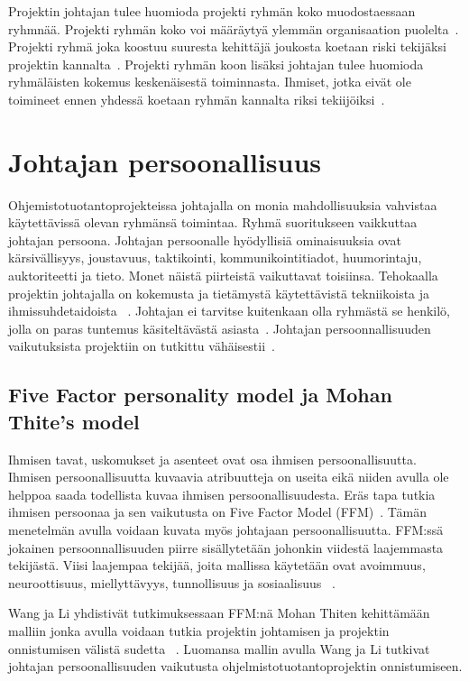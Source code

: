\documentclass[finnish]{tktltiki2}
\theoremstyle{definition}
\theoremstyle{remark}
\begin{document}
Projektin johtajan tulee huomioda projekti ryhmän koko muodostaessaan ryhmnää. Projekti ryhmän koko voi määräytyä ylemmän organisaation puolelta~\cite{McLeod:2011:FAS:1978802.1978803}. Projekti ryhmä joka koostuu suuresta kehittäjä joukosta koetaan riski tekijäksi projektin kannalta~\cite{McLeod:2011:FAS:1978802.1978803}. Projekti ryhmän koon lisäksi johtajan tulee huomioda ryhmäläisten kokemus keskenäisestä toiminnasta. Ihmiset, jotka eivät ole toimineet ennen yhdessä koetaan ryhmän kannalta riksi tekiijöiksi~\cite{McLeod:2011:FAS:1978802.1978803}.

\section{Johtajan persoonallisuus}

Ohjemistotuotantoprojekteissa johtajalla on monia mahdollisuuksia vahvistaa käytettävissä olevan ryhmänsä toimintaa. Ryhmä suoritukseen vaikkuttaa johtajan persoona. Johtajan persoonalle hyödyllisiä ominaisuuksia ovat kärsivällisyys, joustavuus, taktikointi, kommunikointitiadot, huumorintaju, auktoriteetti ja tieto. Monet näistä piirteistä vaikuttavat toisiinsa. Tehokaalla projektin johtajalla on kokemusta ja tietämystä käytettävistä tekniikoista ja ihmissuhdetaidoista ~\cite{McLeod:2011:FAS:1978802.1978803}. Johtajan ei tarvitse kuitenkaan olla ryhmästä se henkilö, jolla on paras tuntemus käsiteltävästä asiasta~\cite{4017705}. Johtajan persoonnallisuuden vaikutuksista projektiin on tutkittu vähäisestii~\cite{Wang:2009:PMP:1639950.1640049}. 

\subsection{Five Factor personality model ja Mohan Thite's model }

Ihmisen tavat, uskomukset ja asenteet ovat osa ihmisen persoonallisuutta. Ihmisen persoonallisuutta kuvaavia atribuutteja on useita eikä niiden avulla ole helppoa saada todellista kuvaa ihmisen persoonallisuudesta. Eräs tapa tutkia ihmisen persoonaa ja sen vaikutusta on Five Factor Model (FFM)~\cite{barrick2006big}. Tämän menetelmän avulla voidaan kuvata myös johtajaan persoonallisuutta. FFM:ssä jokainen persoonnallisuuden piirre sisällytetään johonkin viidestä laajemmasta tekijästä. Viisi laajempaa tekijää, joita mallissa käytetään ovat avoimmuus, neuroottisuus, miellyttävyys, tunnollisuus ja sosiaalisuus ~\cite{barrick2006big}.

Wang ja Li yhdistivät tutkimuksessaan FFM:nä Mohan Thiten kehittämään malliin jonka avulla voidaan tutkia projektin johtamisen ja projektin onnistumisen välistä sudetta ~\cite{Wang:2009:PMP:1639950.1640049}. Luomansa mallin avulla Wang ja Li tutkivat johtajan persoonallisuuden vaikutusta ohjelmistotuotantoprojektin onnistumiseen. 
\end{document}
